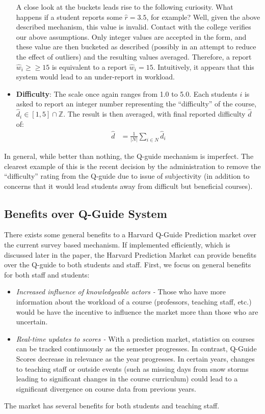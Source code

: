\begin{itemize}
A close look at the buckets leads rise to the following curiosity. What happens if a student reports some $\hat{r} = 3.5$, for example? Well, given the above described mechanism, this value is invalid. Contact with the college verifies our above assumptions. Only integer values are accepted in the form, and these value are then bucketed as described (possibly in an attempt to reduce the effect of outliers) and the resulting values averaged. Therefore, a report $\hat{w}_i \geq\geq 15$ is equivalent to a report $\hat{w}_i = 15$. Intuitively, it appears that this system would lead to an under-report in workload.
\item \textbf{Difficulty}: The scale once again ranges from 1.0 to 5.0. Each students $i$ is asked to report an integer number representing the ``difficulty'' of the course, $\hat{d}_i \in [1,5]  \cap \mathbb{Z}$. The result is then averaged, with final reported difficulty $\hat{d}$ of:
\begin{align}
\hat{d} &= \frac{1}{|N|}\sum_{i \in N} \hat{d}_i
\end{align}
\end{itemize}
 In general, while better than nothing, the Q-guide mechanism is imperfect. The clearest example of this is the recent decision by the administration to remove the ``difficulty'' rating from the Q-guide due to issue of subjectivity (in addition to concerns that it would lead students away from difficult but beneficial courses). 

\subsection{Benefits over Q-Guide System}
There exists some general benefits to a Harvard Q-Guide Prediction market over the current survey based mechanism. If implemented efficiently, which is discussed later in the paper, the Harvard Prediction Market can provide benefits over the Q-guide to both students and staff. First, we focus on general benefits for both staff and students:
\begin{itemize}
\item \textit{Increased influence of knowledgeable actors -} Those who have more information about the workload of a course (professors, teaching staff, etc.) would be have the incentive to influence the market more than those who are uncertain.
\item \textit{Real-time updates to scores -} With a prediction market, statistics on courses can be tracked continuously as the semester progresses. In contrast, Q-Guide Scores decrease in relevance as the year progresses. In certain years, changes to teaching staff or outside events (such as missing days from snow storms leading to significant changes in the course curriculum) could lead to a significant divergence on course data from previous years. 
\end{itemize}
 The market has several benefits for both students and teaching staff.

